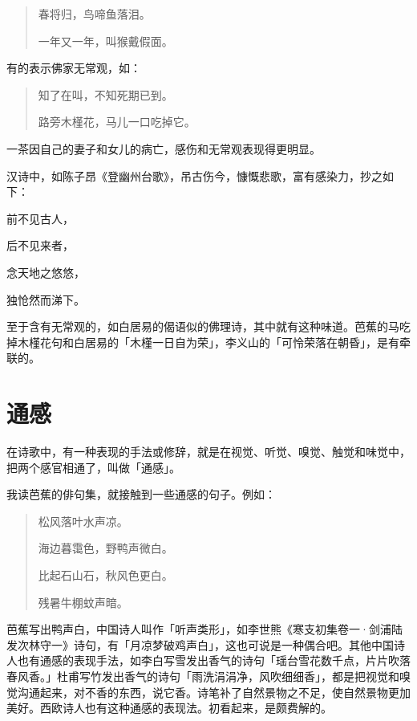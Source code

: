 {    \begin{quote}
        春将归，鸟啼鱼落泪。

        一年又一年，叫猴戴假面。
    \end{quote}

    有的表示佛家无常观，如：

    \begin{quote}
        知了在叫，不知死期已到。

        路旁木槿花，马儿一口吃掉它。
    \end{quote}

    一茶因自己的妻子和女儿的病亡，感伤和无常观表现得更明显。

    汉诗中，如陈子昂《登幽州台歌》，吊古伤今，慷慨悲歌，富有感染力，抄之如下：

    \begin{center}
        前不见古人，

        后不见来者，

        念天地之悠悠，

        独怆然而涕下。
    \end{center}

    至于含有无常观的，如白居易的偈语似的佛理诗，其中就有这种味道。芭蕉的马吃掉木槿花句和白居易的「木槿一日自为荣」，李义山的「可怜荣落在朝昏」，是有牵联的。

    \section*{\FS 通感}

    在诗歌中，有一种表现的手法或修辞，就是在视觉、听觉、嗅觉、触觉和味觉中，把两个感官相通了，叫做「通感」。

    我读芭蕉的俳句集，就接触到一些通感的句子。例如：

    \begin{quote}
        松风落叶水声凉。

        海边暮霭色，野鸭声微白。

        比起石山石，秋风色更白。

        残暑牛棚蚊声暗。
    \end{quote}

    芭蕉写出鸭声白，中国诗人叫作「听声类形」，如李世熊《寒支初集卷一·剑浦陆发次林守一》诗句，有「月凉梦破鸡声白」，这也可说是一种偶合吧。其他中国诗人也有通感的表现手法，如李白写雪发出香气的诗句「瑶台雪花数千点，片片吹落春风香。」杜甫写竹发出香气的诗句「雨洗涓涓净，风吹细细香」，都是把视觉和嗅觉沟通起来，对不香的东西，说它香。诗笔补了自然景物之不足，使自然景物更加美好。西欧诗人也有这种通感的表现法。初看起来，是颇费解的。

}
